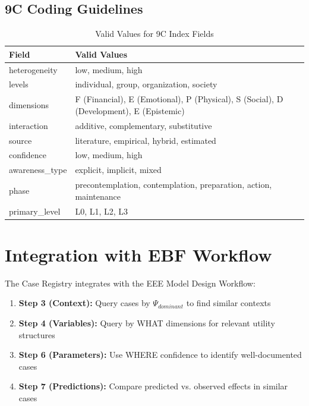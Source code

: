 \subsection{9C Coding Guidelines}

\begin{table}[h]
\centering
\begin{tabular}{lp{8cm}}
\toprule
\textbf{Field} & \textbf{Valid Values} \\
\midrule
heterogeneity & low, medium, high \\
levels & individual, group, organization, society \\
dimensions & F (Financial), E (Emotional), P (Physical), S (Social), D (Development), E (Epistemic) \\
interaction & additive, complementary, substitutive \\
source & literature, empirical, hybrid, estimated \\
confidence & low, medium, high \\
awareness\_type & explicit, implicit, mixed \\
phase & precontemplation, contemplation, preparation, action, maintenance \\
primary\_level & L0, L1, L2, L3 \\
\bottomrule
\end{tabular}
\caption{Valid Values for 9C Index Fields}
\end{table}

\section{Integration with EBF Workflow}

The Case Registry integrates with the EEE Model Design Workflow:

\begin{enumerate}
    \item \textbf{Step 3 (Context):} Query cases by $\Psi_{dominant}$ to find similar contexts
    \item \textbf{Step 4 (Variables):} Query by WHAT dimensions for relevant utility structures
    \item \textbf{Step 6 (Parameters):} Use WHERE confidence to identify well-documented cases
    \item \textbf{Step 7 (Predictions):} Compare predicted vs. observed effects in similar cases
\end{enumerate}

